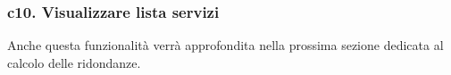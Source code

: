 


\subsubsection*{c10. Visualizzare lista servizi}
Anche questa funzionalità verrà approfondita nella prossima sezione dedicata al calcolo delle ridondanze.




